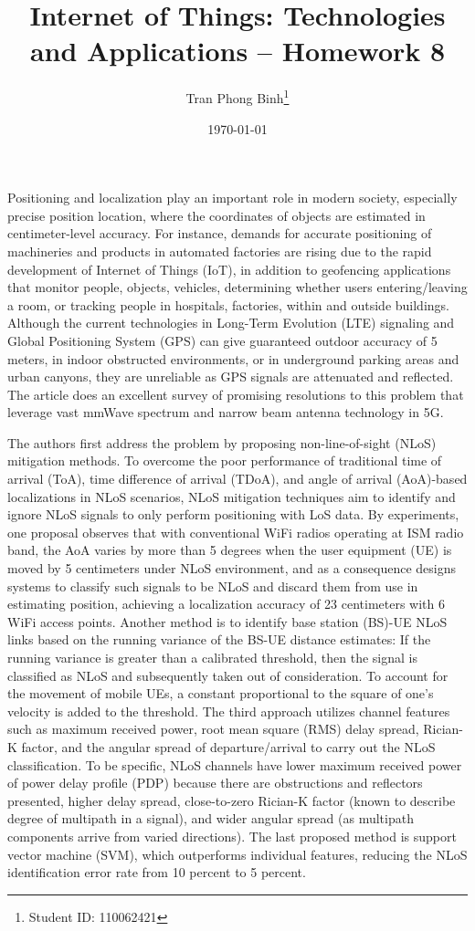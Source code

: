 \documentclass[12pt, a4paper, onside]{article}
\title{\textbf{Internet of Things: Technologies and Applications -- Homework 8}}
\author{Tran Phong Binh\thanks{Student ID: 110062421}}
\affil{Department of Computer Science, National Tsing Hua University}
\date{\today}
\begin{document}
\maketitle

Positioning and localization play an important role in modern society, especially precise position location, where the coordinates of objects are estimated in centimeter-level accuracy. For instance, demands for accurate positioning of machineries and products in automated factories are rising due to the rapid development of Internet of Things (IoT), in addition to geofencing applications that monitor people, objects, vehicles, determining whether users entering/leaving a room, or tracking people in hospitals, factories, within and outside buildings. Although the current technologies in Long-Term Evolution (LTE) signaling and Global Positioning System (GPS) can give guaranteed outdoor accuracy of 5 meters, in indoor obstructed environments, or in underground parking areas and urban canyons, they are unreliable as GPS signals are attenuated and reflected. The article \cite{localization5g} does an excellent survey of promising resolutions to this problem that leverage vast mmWave spectrum and narrow beam antenna technology in 5G.

The authors first address the problem by proposing non-line-of-sight (NLoS) mitigation methods. To overcome the poor performance of traditional time of arrival (ToA), time difference of arrival (TDoA), and angle of arrival (AoA)-based localizations in NLoS scenarios, NLoS mitigation techniques aim to identify and ignore NLoS signals to only perform positioning with LoS data. By experiments, one proposal observes that with conventional WiFi radios operating at ISM radio band, the AoA varies by more than 5 degrees when the user equipment (UE) is moved by 5 centimeters under NLoS environment, and as a consequence designs systems to classify such signals to be NLoS and discard them from use in estimating position, achieving a localization accuracy of 23 centimeters with 6 WiFi access points. Another method is to identify base station (BS)-UE NLoS links based on the running variance of the BS-UE distance estimates: If the running variance is greater than a calibrated threshold, then the signal is classified as NLoS and subsequently taken out of consideration. To account for the movement of mobile UEs, a constant proportional to the square of one's velocity is added to the threshold. The third approach utilizes channel features such as maximum received power, root mean square (RMS) delay spread, Rician-K factor, and the angular spread of departure/arrival to carry out the NLoS classification. To be specific, NLoS channels have lower maximum received power of power delay profile (PDP) because there are obstructions and reflectors presented, higher delay spread, close-to-zero Rician-K factor (known to describe degree of multipath in a signal), and wider angular spread (as multipath components arrive from varied directions). The last proposed method is support vector machine (SVM), which outperforms individual features, reducing the NLoS identification error rate from 10 percent to 5 percent.
\end{document}
